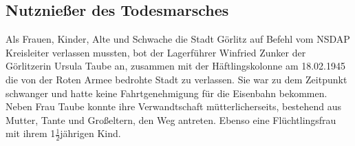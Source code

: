 \begin{fshaded}\vspace{-.5cm}\subsection*{Nutznießer des Todesmarsches}
Als Frauen, Kinder, Alte und Schwache die Stadt Görlitz auf Befehl vom NSDAP Kreisleiter verlassen mussten, bot der Lagerführer Winfried Zunker der Görlitzerin Ursula Taube an, zusammen mit der Häftlingskolonne am 18.02.1945 die von der Roten Armee bedrohte Stadt zu verlassen. Sie war zu dem Zeitpunkt schwanger und hatte keine Fahrtgenehmigung für die Eisenbahn bekommen. Neben Frau Taube konnte ihre Verwandtschaft mütterlicherseits, bestehend aus Mutter, Tante und Großeltern, den Weg antreten. Ebenso eine Flüchtlingsfrau mit ihrem 1$\frac{1}{2}$jährigen Kind.


\end{fshaded}
